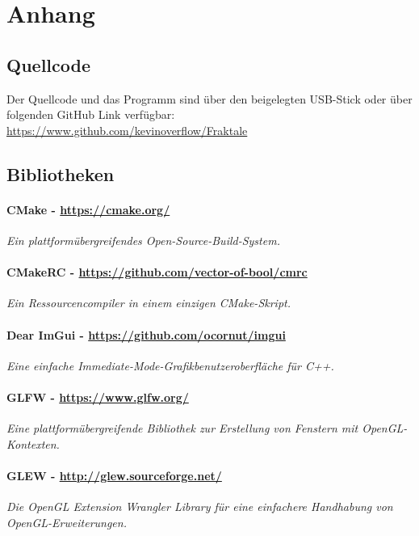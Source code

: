 \titlespacing*{\chapter}{0pt}{-30pt}{20pt}

\chapter{Anhang}
\thispagestyle{fancy} %

\section{Quellcode}
Der Quellcode und das Programm sind über den beigelegten USB-Stick oder über
folgenden GitHub Link verfügbar: \newline
\url{https://www.github.com/kevinoverflow/Fraktale}
\section{Bibliotheken}
\subsubsection*{CMake - \url{https://cmake.org/}}
\textit{Ein plattformübergreifendes Open-Source-Build-System.}
\subsubsection*{CMakeRC - \url{https://github.com/vector-of-bool/cmrc}}
\textit{Ein Ressourcencompiler in einem einzigen CMake-Skript.}
\subsubsection*{Dear ImGui - \url{https://github.com/ocornut/imgui}}
\textit{Eine einfache Immediate-Mode-Grafikbenutzeroberfläche für C++.}
\subsubsection*{GLFW - \url{https://www.glfw.org/}}
\textit{Eine plattformübergreifende Bibliothek zur Erstellung von Fenstern mit OpenGL-Kontexten.}
\subsubsection*{GLEW - \url{http://glew.sourceforge.net/}}
\textit{Die OpenGL Extension Wrangler Library für eine einfachere Handhabung von OpenGL-Erweiterungen.}
